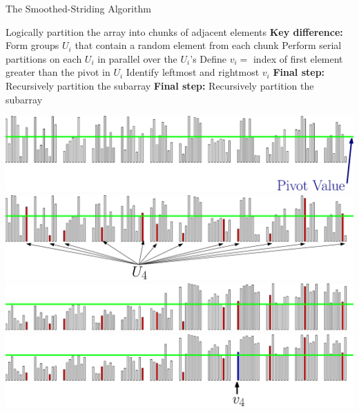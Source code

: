 \documentclass[xcolor=x11names, svgnames, rgb]{beamer}
\begin{document}
\begin{frame}[t]{}
	\vfill
	\begin{center}
		{\Huge The Smoothed-Striding Algorithm}
	\end{center}
	\vfill
\end{frame}


\begin{frame}[t]{}%
	\vspace{0.25cm}
	\begin{overprint}
	Logically partition the array into chunks of adjacent elements
	\onslide<2>\textbf{Key difference:} Form groups $U_i$ that contain a random element from each chunk %
	\onslide<3>Perform serial partitions on each $U_i$ in parallel over the $U_i$'s
	\onslide<4>Define $v_i = $ index of first element greater than the pivot in $U_i$
	\onslide<5>Identify leftmost and rightmost $v_i$
	\onslide<6>\textbf{Final step:} Recursively partition the subarray
	\onslide<7>\textbf{Final step:} Recursively partition the subarray
	\end{overprint}
	\vspace{0.25cm}
	\begin{overprint}
	\includegraphics[width=\linewidth]{imgs/smoothedStridingAlgSim/sim1.eps}
	\onslide<2>\includegraphics[width=\linewidth]{imgs/smoothedStridingAlgSim/sim2.eps}
	\onslide<3>\includegraphics[width=\linewidth]{imgs/smoothedStridingAlgSim/sim3.eps}
	\onslide<4>\includegraphics[width=\linewidth]{imgs/smoothedStridingAlgSim/sim35.eps}

\end{overprint}
\end{frame}
\end{document}
